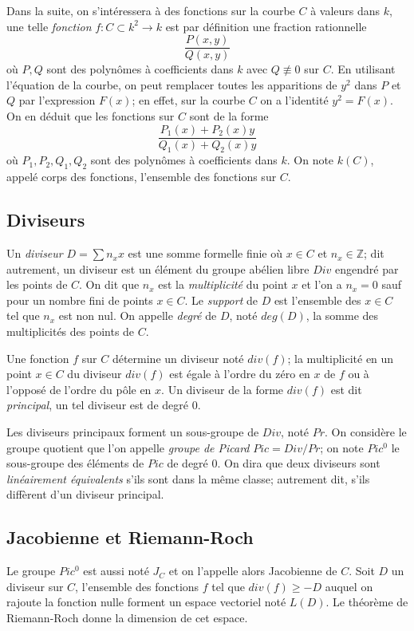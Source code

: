 \documentclass[a4paper]{article}
\theoremstyle{definition}
\theoremstyle{remark}
\numberwithin{equation}{section}
\begin{document}
Dans la suite, on s'intéressera à des fonctions sur la courbe $C$ à valeurs dans $k$, une telle \emph{fonction} $f : C \subset k^2 \longrightarrow k$ est par définition une fraction rationnelle $$\frac{P(x,y)}{Q(x,y)}$$ où $P,Q$ sont des polynômes à coefficients dans $k$ avec $Q \not\equiv 0$ sur $C$. En utilisant l'équation de la courbe, on peut remplacer toutes les apparitions de $y^2$ dans $P$ et $Q$ par l'expression $F(x)$; en effet, sur la courbe $C$ on a l'identité $y^2 = F(x)$. On en déduit que les fonctions sur $C$ sont de la forme $$\frac{P_1(x) + P_2(x)y}{Q_1(x) + Q_2(x)y}$$ où $P_1,P_2,Q_1,Q_2$ sont des polynômes à coefficients dans $k$. On note $k(C)$, appelé corps des fonctions, l'ensemble des fonctions sur $C$.

\subsection{Diviseurs}
Un \emph{diviseur} $D = \sum n_x x$ est une somme formelle finie où $x \in C$ et $n_x \in \mathbb{Z}$; dit autrement, un diviseur est un élément du groupe abélien libre $Div$ engendré par les points de $C$. On dit que $n_x$ est la \emph{multiplicité} du point $x$ et l'on a $n_x = 0$ sauf pour un nombre fini de points $x \in C$. Le \emph{support} de $D$ est l'ensemble des $x \in C$ tel que $n_x$ est non nul. On appelle \emph{degré} de $D$, noté $deg(D)$, la somme des multiplicités des points de $C$.

Une fonction $f$ sur $C$ détermine un diviseur noté $div(f)$; la multiplicité en un point $x \in C$ du diviseur $div(f)$ est égale à l'ordre du zéro en $x$ de $f$ ou à l'opposé de l'ordre du pôle en $x$. Un diviseur de la forme $div(f)$ est dit \emph{principal}, un tel diviseur est de degré 0.

Les diviseurs principaux forment un sous-groupe de $Div$, noté $Pr$. On considère le groupe quotient que l'on appelle \emph{groupe de Picard} $Pic = Div/Pr$; on note $Pic^0$ le sous-groupe des éléments de $Pic$ de degré 0. On dira que deux diviseurs sont \emph{linéairement équivalents} s'ils sont dans la même classe; autrement dit, s'ils diffèrent d'un diviseur principal.

\subsection{Jacobienne et Riemann-Roch}
Le groupe $Pic^0$ est aussi noté $J_C$ et on l'appelle alors Jacobienne de $C$. Soit $D$ un diviseur sur $C$,
l'ensemble des fonctions $f$ tel que $div(f) \geq -D$ auquel on rajoute la fonction nulle forment un espace vectoriel noté $L(D)$.
Le théorème de Riemann-Roch donne la dimension de cet espace.
\end{document}
